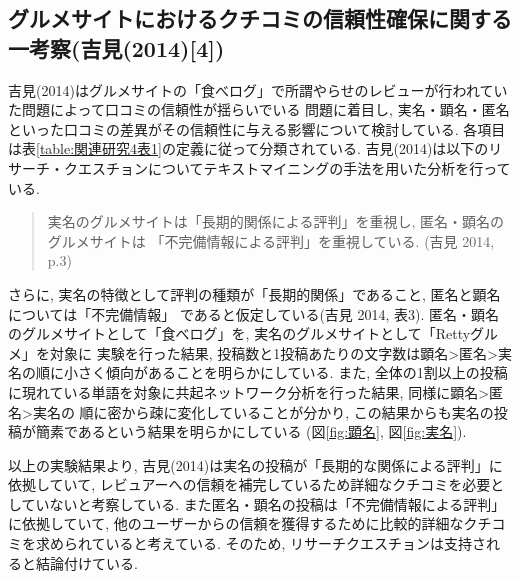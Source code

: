 \documentclass{ltjarticle}
\begin{document}
\subsection{グルメサイトにおけるクチコミの信頼性確保に関する一考察(吉見(2014)[4])}
吉見(2014)はグルメサイトの「食べログ」で所謂やらせのレビューが行われていた問題によって口コミの信頼性が揺らいでいる
問題に着目し, 実名・顕名・匿名といった口コミの差異がその信頼性に与える影響について検討している. 
各項目は表\ref{table:関連研究4表1}の定義に従って分類されている. 
吉見(2014)は以下のリサーチ・クエスチョンについてテキストマイニングの手法を用いた分析を行っている. 
\begin{quote}
    実名のグルメサイトは「長期的関係による評判」を重視し, 匿名・顕名のグルメサイトは
「不完備情報による評判」を重視している. (吉見 2014, p.3)
\end{quote}
さらに, 実名の特徴として評判の種類が「長期的関係」であること, 匿名と顕名については「不完備情報」
であると仮定している(吉見 2014, 表3). 
匿名・顕名のグルメサイトとして「食べログ」を, 実名のグルメサイトとして「Rettyグルメ」を対象に
実験を行った結果, 投稿数と1投稿あたりの文字数は顕名>匿名>実名の順に小さく傾向があることを明らかにしている. 
また, 全体の1割以上の投稿に現れている単語を対象に共起ネットワーク分析を行った結果, 同様に顕名>匿名>実名の
順に密から疎に変化していることが分かり, この結果からも実名の投稿が簡素であるという結果を明らかにしている
(図\ref{fig:顕名}, 図\ref{fig:実名}). 

以上の実験結果より, 吉見(2014)は実名の投稿が「長期的な関係による評判」に依拠していて, 
レビュアーへの信頼を補完しているため詳細なクチコミを必要としていないと考察している. 
また匿名・顕名の投稿は「不完備情報による評判」に依拠していて, 
他のユーザーからの信頼を獲得するために比較的詳細なクチコミを求められていると考えている. 
そのため, リサーチクエスチョンは支持されると結論付けている. 
\end{document}
